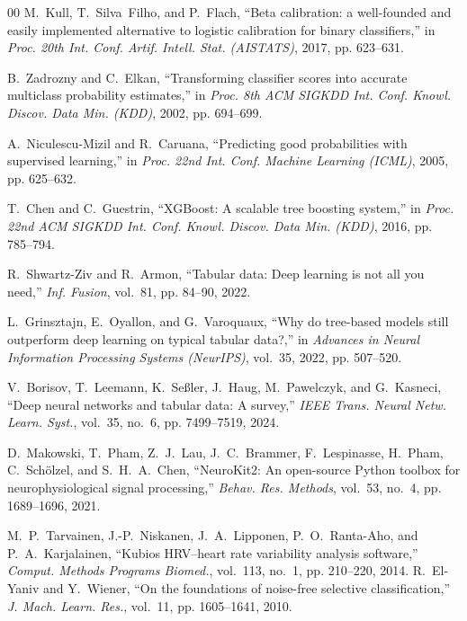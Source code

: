 \documentclass[conference]{IEEEtran}
\begin{document}
\begin{thebibliography}{00}
M.~Kull, T.~Silva~Filho, and P.~Flach, ``Beta calibration: a well-founded and easily implemented alternative to logistic calibration for binary classifiers,'' in \textit{Proc. 20th Int. Conf. Artif. Intell. Stat. (AISTATS)}, 2017, pp. 623--631.

B.~Zadrozny and C.~Elkan, ``Transforming classifier scores into accurate multiclass probability estimates,'' in \textit{Proc. 8th ACM SIGKDD Int. Conf. Knowl. Discov. Data Min. (KDD)}, 2002, pp. 694--699.

A.~Niculescu-Mizil and R.~Caruana, ``Predicting good probabilities with supervised learning,'' in \textit{Proc. 22nd Int. Conf. Machine Learning (ICML)}, 2005, pp. 625--632.

T.~Chen and C.~Guestrin, ``XGBoost: A scalable tree boosting system,'' in \textit{Proc. 22nd ACM SIGKDD Int. Conf. Knowl. Discov. Data Min. (KDD)}, 2016, pp. 785--794.

R.~Shwartz-Ziv and R.~Armon, ``Tabular data: Deep learning is not all you need,'' \textit{Inf. Fusion}, vol.~81, pp. 84--90, 2022.

L.~Grinsztajn, E.~Oyallon, and G.~Varoquaux, ``Why do tree-based models still outperform deep learning on typical tabular data?,'' in \textit{Advances in Neural Information Processing Systems (NeurIPS)}, vol.~35, 2022, pp. 507--520.

V.~Borisov, T.~Leemann, K.~Se\ss{}ler, J.~Haug, M.~Pawelczyk, and G.~Kasneci, ``Deep neural networks and tabular data: A survey,'' \textit{IEEE Trans. Neural Netw. Learn. Syst.}, vol.~35, no.~6, pp. 7499--7519, 2024.

D.~Makowski, T.~Pham, Z.~J.~Lau, J.~C.~Brammer, F.~Lespinasse, H.~Pham, C.~Sch\"olzel, and S.~H.~A.~Chen, ``NeuroKit2: An open-source Python toolbox for neurophysiological signal processing,'' \textit{Behav. Res. Methods}, vol.~53, no.~4, pp. 1689--1696, 2021.

M.~P.~Tarvainen, J.-P.~Niskanen, J.~A.~Lipponen, P.~O.~Ranta-Aho, and P.~A.~Karjalainen, ``Kubios HRV--heart rate variability analysis software,'' \textit{Comput. Methods Programs Biomed.}, vol.~113, no.~1, pp. 210--220, 2014.
R.~El-Yaniv and Y.~Wiener, ``On the foundations of noise-free selective classification,'' \textit{J. Mach. Learn. Res.}, vol.~11, pp. 1605--1641, 2010.


\end{thebibliography}
\end{document}
